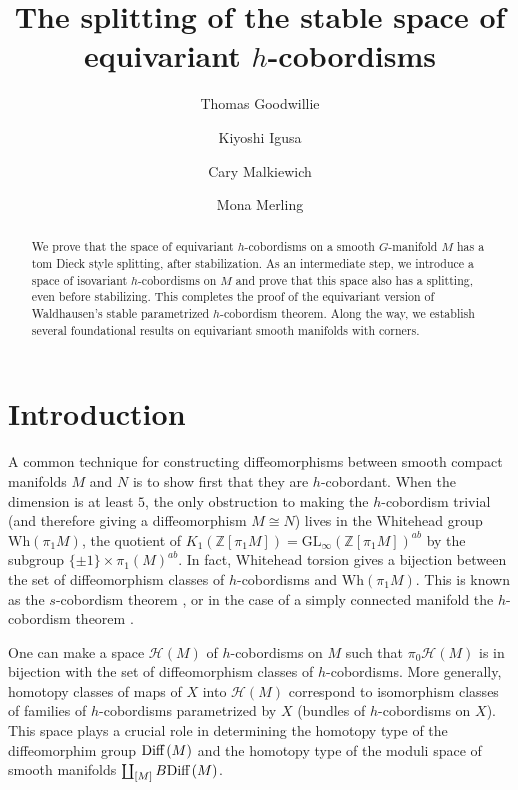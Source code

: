 \documentclass[11pt]{amsart}
\title{The splitting of the stable space of equivariant $h$-cobordisms}
\author{Thomas Goodwillie}
\author{Kiyoshi Igusa}
\author{Cary Malkiewich}
\author{Mona Merling}
\theoremstyle{definition}
\numberwithin{equation}{section}
\numberwithin{figure}{section}
\newcommand{\Z}{\mathbb Z}
\newcommand{\Diff}{\textup{Diff}\,}
\newcommand{\Wh}{\mathrm{Wh}}
\newcommand{\GL}{\mathrm{GL}}
\newlength{\storeparskip}
\begin{document}
\maketitle


\begin{abstract}
We prove that the space of equivariant $h$-cobordisms on a smooth $G$-manifold $M$ has a tom Dieck style splitting, after stabilization. As an intermediate step, we introduce a space of isovariant $h$-cobordisms on $M$ and prove that this space also has a splitting, even before stabilizing. This completes the proof of the equivariant version of Waldhausen's stable parametrized $h$-cobordism theorem. Along the way, we establish several foundational results on equivariant smooth manifolds with corners.
\end{abstract}

\begingroup%
\setlength{\parskip}{\storeparskip}%
\makeatletter
\def\l@subsection{\@tocline{2}{0pt}{2.5pc}{5pc}{}}
\def\l@subsubsection{\@tocline{2}{0pt}{5pc}{7.5pc}{}}
\makeatother
\tableofcontents
\endgroup%

\section{Introduction}



A common technique for constructing diffeomorphisms between smooth compact manifolds $M$ and $N$ is to show first that they are $h$-cobordant. When the dimension is at least $5$, the only obstruction to making the $h$-cobordism trivial (and therefore giving a diffeomorphism $M \cong N$) lives in the Whitehead group $\Wh(\pi_1M)$, the quotient of $K_1(\Z[\pi_1 M]) = \GL_\infty(\Z[\pi_1 M])^{ab}$ by the subgroup $\{\pm 1\} \times \pi_1(M)^{ab}$. In fact, Whitehead torsion gives a bijection between the set of diffeomorphism classes of $h$-cobordisms and $\Wh(\pi_1M)$. This is known as the $s$-cobordism theorem \cite{barden, mazur, stallings, BMS}, or in the case of a simply connected manifold the $h$-cobordism theorem \cite{smale}.

One can make a space $\mathcal{H}(M)$ of $h$-cobordisms on $M$ such that $\pi_0\mathcal H(M)$ is in bijection with the set of diffeomorphism classes of $h$-cobordisms. More generally, homotopy classes of maps of $X$ into $\mathcal{H}(M)$ correspond to isomorphism classes of families of $h$-cobordisms parametrized by $X$ (bundles of $h$-cobordisms on $X$). This space plays a crucial role in determining the homotopy type of the diffeomorphim group $\Diff(M)$ and the homotopy type of the moduli space of smooth manifolds $\coprod_{[M]} B\Diff(M)$. 
\end{document}
